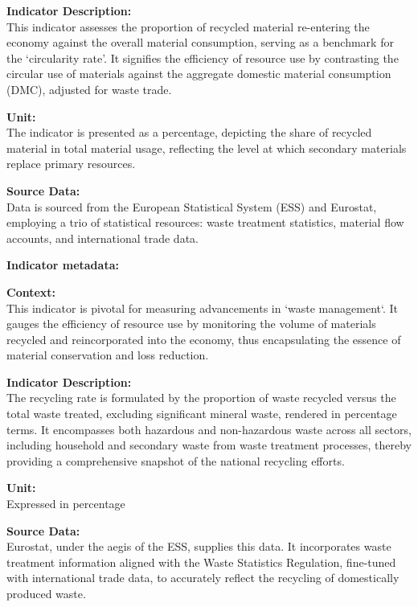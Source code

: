 {\large\textbf{Indicator Description:}}  \\ \indent
This indicator assesses the proportion of recycled material re-entering the economy against the overall material consumption, serving as a benchmark for the `circularity rate'. It signifies the efficiency of resource use by contrasting the circular use of materials against the aggregate domestic material consumption (DMC), adjusted for waste trade.

{\large\textbf{Unit:}}  \\ \indent
The indicator is presented as a percentage, depicting the share of recycled material in total material usage, reflecting the level at which secondary materials replace primary resources.

{\large\textbf{Source Data:}}  \\ \indent
Data is sourced from the European Statistical System (ESS) and Eurostat, employing a trio of statistical resources: waste treatment statistics, material flow accounts, and international trade data.

\textbf{Indicator metadata:}   \href{https://ec.europa.eu/eurostat/cache/metadata/en/cei_wm010_esmsip2.htm}{\faExternalLink}

{\large\textbf{Context:}}  \\ \indent
This indicator is pivotal for measuring advancements in `waste management`. It gauges the efficiency of resource use by monitoring the volume of materials recycled and reincorporated into the economy, thus encapsulating the essence of material conservation and loss reduction.

{\large\textbf{Indicator Description:}}  \\ \indent
The recycling rate is formulated by the proportion of waste recycled versus the total waste treated, excluding significant mineral waste, rendered in percentage terms. It encompasses both hazardous and non-hazardous waste across all sectors, including household and secondary waste from waste treatment processes, thereby providing a comprehensive snapshot of the national recycling efforts.

{\large\textbf{Unit:}}  \\ \indent
Expressed in percentage

{\large\textbf{Source Data:}}  \\ \indent
Eurostat, under the aegis of the ESS, supplies this data. It incorporates waste treatment information aligned with the Waste Statistics Regulation, fine-tuned with international trade data, to accurately reflect the recycling of domestically produced waste.

